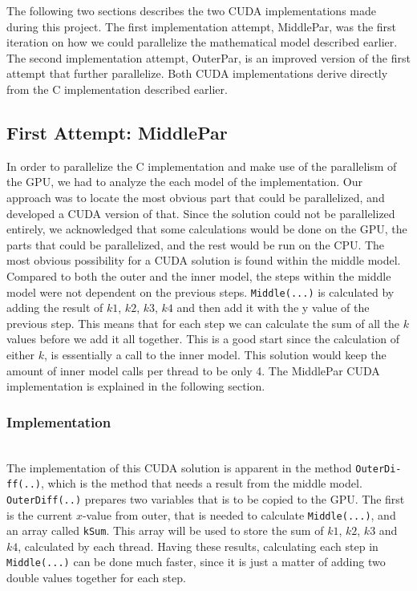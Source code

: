 The following two sections describes the two CUDA implementations made during this project. The first implementation attempt, MiddlePar, was the first iteration on how we could parallelize the mathematical model described earlier. The second implementation attempt, OuterPar, is an improved version of the first attempt that further parallelize. Both CUDA implementations derive directly from the C implementation described earlier.

\subsection{First Attempt: MiddlePar}
\label{sec:firstattempt}
In order to parallelize the C implementation and make use of the parallelism of the GPU, we had to analyze the each model of the implementation. Our approach was to locate the most obvious part that could be parallelized, and developed a CUDA version of that. Since the solution could not be parallelized entirely, we acknowledged that some calculations would be done on the GPU, the parts that could be parallelized, and the rest would be run on the CPU. The most obvious possibility for a CUDA solution is found within the middle model. Compared to both the outer and the inner model, the steps within the middle model were not dependent on the previous steps. \texttt{Middle(...)} is calculated by adding the result of $k1$, $k2$, $k3$, $k4$ and then add it with the y value of the previous step. This means that for each step we can calculate the sum of all the $k$ values before we add it all together. This is a good start since the calculation of either $k$, is essentially a call to the inner model. This solution would keep the amount of inner model calls per thread to be only 4. The MiddlePar CUDA implementation is explained in the following section.

\subsubsection{Implementation} \hfill\\
The implementation of this CUDA solution is apparent in the method \texttt{OuterDi-\\ff(..)}, which is the method that needs a result from the middle model. \texttt{OuterDiff(..)} prepares two variables that is to be copied to the GPU. The first is the current $x$-value from outer, that is needed to calculate \texttt{Middle(...)}, and an array called \texttt{kSum}. This array will be used to store the sum of $k1$, $k2$, $k3$ and $k4$, calculated by each thread. Having these results, calculating each step in \texttt{Middle(...)} can be done much faster, since it is just a matter of adding two double values together for each step. \\ \\


